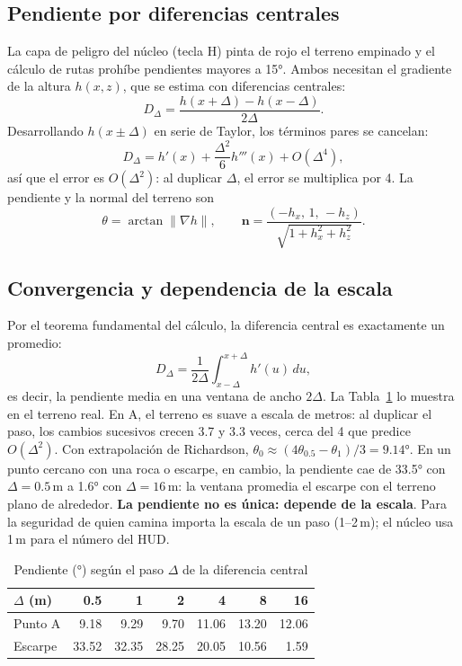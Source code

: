 \documentclass[conference]{IEEEtran}
\begin{document}
\subsection{Pendiente por diferencias centrales}
La capa de peligro del núcleo (tecla H) pinta de rojo el terreno empinado y el cálculo de rutas prohíbe pendientes mayores a 15°. Ambos necesitan el gradiente de la altura $h(x,z)$, que se estima con diferencias centrales:
\begin{equation}
D_\Delta = \frac{h(x+\Delta)-h(x-\Delta)}{2\Delta}.
\end{equation}
Desarrollando $h(x\pm\Delta)$ en serie de Taylor, los términos pares se cancelan:
\begin{equation}
D_\Delta = h'(x) + \frac{\Delta^2}{6}h'''(x) + O(\Delta^4),
\end{equation}
así que el error es $O(\Delta^2)$: al duplicar $\Delta$, el error se multiplica por 4. La pendiente y la normal del terreno son
\begin{equation}
\theta = \arctan\lVert\nabla h\rVert,\qquad \mathbf n = \frac{(-h_x,\,1,\,-h_z)}{\sqrt{1+h_x^2+h_z^2}}.
\end{equation}

\subsection{Convergencia y dependencia de la escala}
Por el teorema fundamental del cálculo, la diferencia central es exactamente un promedio:
\begin{equation}
D_\Delta = \frac{1}{2\Delta}\int_{x-\Delta}^{x+\Delta} h'(u)\,du,
\end{equation}
es decir, la pendiente media en una ventana de ancho $2\Delta$. La Tabla~\ref{tab:deriv} lo muestra en el terreno real. En A, el terreno es suave a escala de metros: al duplicar el paso, los cambios sucesivos crecen 3.7 y 3.3 veces, cerca del 4 que predice $O(\Delta^2)$. Con extrapolación de Richardson, $\theta_0 \approx (4\theta_{0.5} - \theta_{1})/3 = 9.14°$. En un punto cercano con una roca o escarpe, en cambio, la pendiente cae de 33.5° con $\Delta = 0.5$\,m a 1.6° con $\Delta = 16$\,m: la ventana promedia el escarpe con el terreno plano de alrededor. \textbf{La pendiente no es única: depende de la escala}. Para la seguridad de quien camina importa la escala de un paso (1--2\,m); el núcleo usa 1\,m para el número del HUD.

\begin{table}[t]
\caption{Pendiente (°) según el paso $\Delta$ de la diferencia central}
\label{tab:deriv}
\centering\small
\begin{tabular}{@{}lrrrrrr@{}}
\toprule
$\Delta$ (m) & 0.5 & 1 & 2 & 4 & 8 & 16 \\ \midrule
Punto A & 9.18 & 9.29 & 9.70 & 11.06 & 13.20 & 12.06 \\
Escarpe & 33.52 & 32.35 & 28.25 & 20.05 & 10.56 & 1.59 \\
\bottomrule
\end{tabular}
\end{table}
\end{document}
